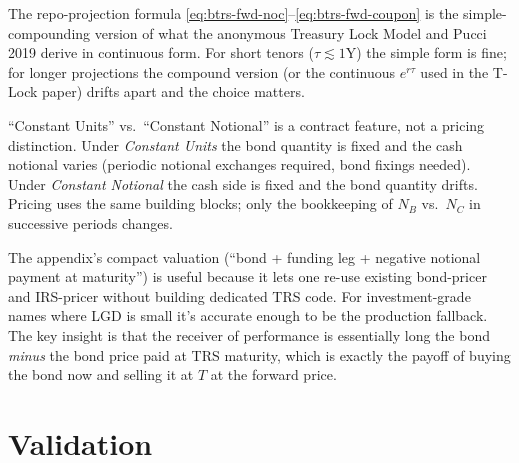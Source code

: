 \documentclass[11pt,a4paper]{article}
\begin{document}
\begin{commentary}
The repo-projection formula \eqref{eq:btrs-fwd-noc}--\eqref{eq:btrs-fwd-coupon}
is the simple-compounding version of what the anonymous Treasury
Lock Model and Pucci 2019 derive in continuous form. For short tenors
($\tau \lesssim 1$Y) the simple form is fine; for longer projections
the compound version (or the continuous $e^{r\tau}$ used in the
T-Lock paper) drifts apart and the choice matters.
\end{commentary}

\begin{commentary}
``Constant Units'' vs.\ ``Constant Notional'' is a contract feature,
not a pricing distinction. Under \emph{Constant Units} the bond
quantity is fixed and the cash notional varies (periodic notional
exchanges required, bond fixings needed). Under \emph{Constant
Notional} the cash side is fixed and the bond quantity drifts.
Pricing uses the same building blocks; only the bookkeeping of
$N_B$ vs.\ $N_C$ in successive periods changes.
\end{commentary}

\begin{commentary}
The appendix's compact valuation
(``bond + funding leg + negative notional payment at maturity'') is
useful because it lets one re-use existing bond-pricer and IRS-pricer
without building dedicated TRS code. For investment-grade names where
LGD is small it's accurate enough to be the production fallback. The
key insight is that the receiver of performance is essentially long
the bond \emph{minus} the bond price paid at TRS maturity, which is
exactly the payoff of buying the bond now and selling it at $T$ at
the forward price.
\end{commentary}

\section{Validation}
\end{document}
